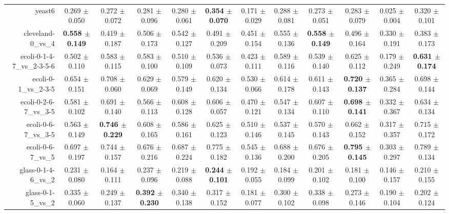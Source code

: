 \begin{table}[!ht]
{\begin{tabular}{r c c c c c c c c c c c}
yeast6 & 0.269 $\pm$ 0.050 & 0.272 $\pm$ 0.072 & 0.281 $\pm$ 0.096 & 0.280 $\pm$ 0.061 & \textbf{0.354 $\pm$ 0.070} & 0.171 $\pm$ 0.029 & 0.288 $\pm$ 0.081 & 0.273 $\pm$ 0.051 & 0.283 $\pm$ 0.079 & 0.025 $\pm$ 0.004 & 0.320 $\pm$ 0.101 \\
cleveland-0\_vs\_4 & \textbf{0.558 $\pm$ 0.149} & 0.419 $\pm$ 0.187 & 0.506 $\pm$ 0.173 & 0.542 $\pm$ 0.127 & 0.491 $\pm$ 0.209 & 0.451 $\pm$ 0.154 & 0.555 $\pm$ 0.136 & \textbf{0.558 $\pm$ 0.149} & 0.496 $\pm$ 0.164 & 0.330 $\pm$ 0.191 & 0.383 $\pm$ 0.173 \\
ecoli-0-1-4-7\_vs\_2-3-5-6 & 0.502 $\pm$ 0.110 & 0.583 $\pm$ 0.115 & 0.583 $\pm$ 0.100 & 0.510 $\pm$ 0.109 & 0.536 $\pm$ 0.073 & 0.423 $\pm$ 0.111 & 0.589 $\pm$ 0.116 & 0.539 $\pm$ 0.140 & 0.625 $\pm$ 0.112 & 0.179 $\pm$ 0.249 & \textbf{0.631 $\pm$ 0.174} \\
ecoli-0-1\_vs\_2-3-5 & 0.654 $\pm$ 0.151 & 0.708 $\pm$ 0.060 & 0.629 $\pm$ 0.069 & 0.579 $\pm$ 0.149 & 0.620 $\pm$ 0.134 & 0.530 $\pm$ 0.066 & 0.614 $\pm$ 0.178 & 0.611 $\pm$ 0.143 & \textbf{0.720 $\pm$ 0.137} & 0.365 $\pm$ 0.284 & 0.698 $\pm$ 0.144 \\
ecoli-0-2-6-7\_vs\_3-5 & 0.581 $\pm$ 0.102 & 0.691 $\pm$ 0.140 & 0.566 $\pm$ 0.113 & 0.608 $\pm$ 0.128 & 0.606 $\pm$ 0.057 & 0.470 $\pm$ 0.121 & 0.547 $\pm$ 0.134 & 0.607 $\pm$ 0.110 & \textbf{0.698 $\pm$ 0.141} & 0.332 $\pm$ 0.367 & 0.634 $\pm$ 0.134 \\
ecoli-0-6-7\_vs\_3-5 & 0.563 $\pm$ 0.149 & \textbf{0.746 $\pm$ 0.229} & 0.608 $\pm$ 0.165 & 0.586 $\pm$ 0.161 & 0.625 $\pm$ 0.123 & 0.510 $\pm$ 0.146 & 0.537 $\pm$ 0.145 & 0.570 $\pm$ 0.143 & 0.662 $\pm$ 0.152 & 0.317 $\pm$ 0.357 & 0.715 $\pm$ 0.172 \\
ecoli-0-6-7\_vs\_5 & 0.697 $\pm$ 0.197 & 0.744 $\pm$ 0.157 & 0.676 $\pm$ 0.216 & 0.687 $\pm$ 0.224 & 0.775 $\pm$ 0.182 & 0.545 $\pm$ 0.136 & 0.688 $\pm$ 0.200 & 0.676 $\pm$ 0.205 & \textbf{0.795 $\pm$ 0.145} & 0.303 $\pm$ 0.297 & 0.789 $\pm$ 0.134 \\
glass-0-1-4-6\_vs\_2 & 0.231 $\pm$ 0.080 & 0.164 $\pm$ 0.111 & 0.237 $\pm$ 0.096 & 0.219 $\pm$ 0.088 & \textbf{0.244 $\pm$ 0.101} & 0.192 $\pm$ 0.055 & 0.184 $\pm$ 0.099 & 0.201 $\pm$ 0.102 & 0.181 $\pm$ 0.100 & 0.146 $\pm$ 0.157 & 0.210 $\pm$ 0.155 \\
glass-0-1-5\_vs\_2 & 0.335 $\pm$ 0.060 & 0.249 $\pm$ 0.137 & \textbf{0.392 $\pm$ 0.230} & 0.340 $\pm$ 0.138 & 0.317 $\pm$ 0.152 & 0.181 $\pm$ 0.077 & 0.300 $\pm$ 0.102 & 0.338 $\pm$ 0.098 & 0.273 $\pm$ 0.146 & 0.190 $\pm$ 0.104 & 0.202 $\pm$ 0.124 \\

\end{tabular}}
\end{table}
